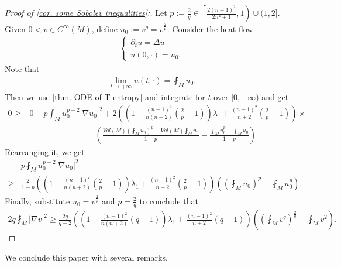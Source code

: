 \documentclass[11pt]{amsart}
\numberwithin{equation}{section}
\numberwithin{lemma}{section}
\numberwithin{proposition}{section}
\numberwithin{corollary}{section}
\numberwithin{remark}{section}
\begin{document}
\begin{proof}[Proof of \cref{cor. some Sobolev inequalities}:]
Let $p:=\frac{2}{q}\in\left[\frac{2(n-1)^2}{2n^2+1},1\right)\cup(1,2]$.
Given $0<v\in C^{\infty}(M)$, define $u_0:=v^q=v^{\frac{2}{p}}$. Consider the heat flow
    \begin{align*}
        \begin{cases}
            \partial_tu=\Delta u\\
            u(0,\cdot)=u_0.
        \end{cases}
    \end{align*}
    Note that
    \begin{align*}
        \lim_{t\to+\infty}u(t,\cdot)=\fint_M u_0.
    \end{align*}
    Then we use \cref{thm. ODE of T entropy} and integrate for $t$ over $[0,+\infty)$ and get
    \begin{align*}
        0
        \geq&0-p\int_M u_0^{p-2}|\nabla u_0|^2
        +2\left(\left(
        1-\frac{(n-1)^2}{n(n+2)}\left(\frac{2}{p}-1\right)
        \right)\lambda_1
        +\frac{(n-1)^2}{n+2}\left(\frac{2}{p}-1\right)
        \right)\times\\
        &\quad\quad\quad\quad\quad\quad\quad\quad\left(
        \frac{Vol(M)(\fint_Mu_0)^p-Vol(M)\fint_M u_0}{1-p}
        -\frac{\int_M u_0^p-\int_M u_0}{1-p}
        \right)
    \end{align*}
    Rearranging it, we get
    \begin{align*}
        &p\fint_M u_0^{p-2}|\nabla u_0|^2\\
        \geq&\frac{2}{1-p}
        \left(\left(
        1-\frac{(n-1)^2}{n(n+2)}\left(\frac{2}{p}-1\right)
        \right)\lambda_1
        +\frac{(n-1)^2}{n+2}\left(\frac{2}{p}-1\right)
        \right)
        \left(
        \left(\fint_M u_0\right)^p-\fint_M u_0^p
        \right).
    \end{align*}
    Finally, substitute $u_0=v^{\frac{2}{p}}$ and $p=\frac{2}{q}$ to conclude that
    \begin{align*}
        2q\fint_M|\nabla v|^2
        \geq
        \frac{2q}{q-2}
        \left(\left(
        1-\frac{(n-1)^2}{n(n+2)}(q-1)
        \right)\lambda_1
        +\frac{(n-1)^2}{n+2}(q-1)
        \right)
        \left(
        \left(\fint_M v^q\right)^{\frac{2}{q}}
        -\fint_M v^2
        \right).
    \end{align*}
\end{proof}
We conclude this paper with several remarks.
\end{document}
